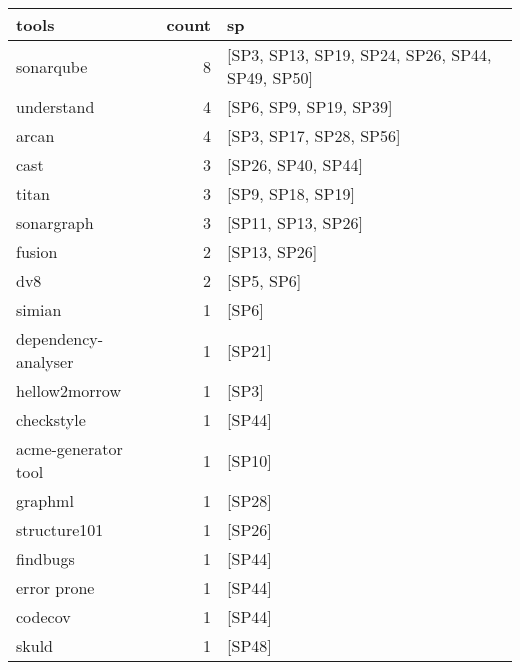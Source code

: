 \begin{tabular}{lrl}
\toprule
               tools &  count &                                                     sp \\
\midrule
           sonarqube &      8 &        [SP3, SP13, SP19, SP24, SP26, SP44, SP49, SP50] \\
          understand &      4 &                                 [SP6, SP9, SP19, SP39] \\
               arcan &      4 &                                [SP3, SP17, SP28, SP56] \\
                cast &      3 &                                     [SP26, SP40, SP44] \\
               titan &      3 &                                      [SP9, SP18, SP19] \\
          sonargraph &      3 &                                     [SP11, SP13, SP26] \\
              fusion &      2 &                                           [SP13, SP26] \\
                 dv8 &      2 &                                             [SP5, SP6] \\
              simian &      1 &                                                  [SP6] \\
 dependency-analyser &      1 &                                                 [SP21] \\
       hellow2morrow &      1 &                                                  [SP3] \\
          checkstyle &      1 &                                                 [SP44] \\
 acme-generator tool &      1 &                                                 [SP10] \\
             graphml &      1 &                                                 [SP28] \\
        structure101 &      1 &                                                 [SP26] \\
            findbugs &      1 &                                                 [SP44] \\
         error prone &      1 &                                                 [SP44] \\
             codecov &      1 &                                                 [SP44] \\
               skuld &      1 &                                                 [SP48] \\

\end{tabular}
